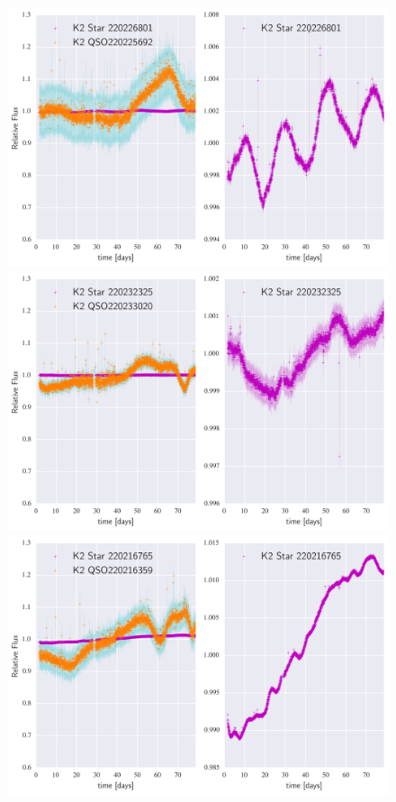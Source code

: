\documentclass[a4paper,fleqn,usenatbib]{mnras}
\begin{document}
        	\begin{figure}
 	\includegraphics[width=\columnwidth]{220225692NearestNeighbor.png}
 	\includegraphics[width=\columnwidth]{220233020NearestNeighbor.png}
 	\includegraphics[width=\columnwidth]{220216359NearestNeighbor.png}
        		\caption{}
        		\label{fig:example_figure}
        	\end{figure}           	
        	
\end{document}
